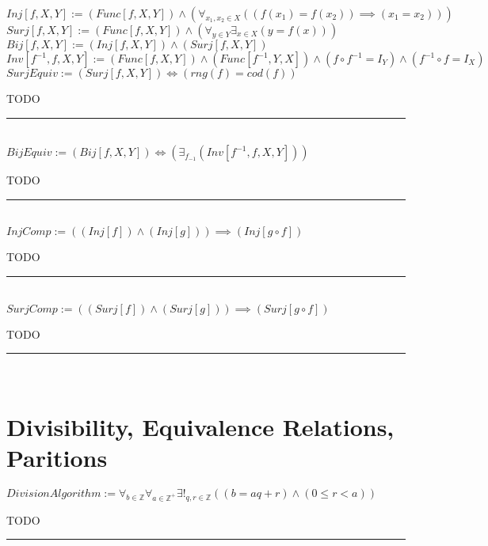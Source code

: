 \documentclass{book}
\newcommand{\abr}{:=}
\begin{document}
$Inj[f, X, Y] \abr (Func[f, X, Y]) \land (\forall_{x_1, x_2 \in X}((f(x_1) = f(x_2)) \implies (x_1 = x_2)))$ \\ %
$Surj[f, X, Y] \abr (Func[f, X, Y]) \land (\forall_{y \in Y} \exists_{x \in X}(y = f(x)))$ \\ %
$Bij[f, X, Y] \abr (Inj[f, X, Y]) \land (Surj[f, X, Y])$ \\ %
$Inv[f^{-1}, f, X, Y] \abr (Func[f, X, Y]) \land (Func[f^{-1}, Y, X]) \land (f \circ f^{-1} = I_Y) \land (f^{-1} \circ f = I_X)$ \\

$SurjEquiv \abr (Surj[f, X, Y]) \iff (rng(f) = cod(f))$ \\
\begin{enumerate}
  \lit TODO
\end{enumerate} \vspace{.75mm} \hrule \vspace{.75mm} \ \\ 

$BijEquiv \abr (Bij[f, X, Y]) \iff (\exists_{f_{-1}}(Inv[f^{-1}, f, X, Y]))$ \\
\begin{enumerate}
  \lit TODO
\end{enumerate} \vspace{.75mm} \hrule \vspace{.75mm} \ \\ 

$InjComp \abr ((Inj[f]) \land (Inj[g])) \implies (Inj[g \circ f])$
\begin{enumerate}
  \lit TODO
\end{enumerate} \vspace{.75mm} \hrule \vspace{.75mm} \ \\ 

$SurjComp \abr ((Surj[f]) \land (Surj[g])) \implies (Surj[g \circ f])$
\begin{enumerate}
  \lit TODO
\end{enumerate} \vspace{.75mm} \hrule \vspace{.75mm} \ \\ 


\section{Divisibility, Equivalence Relations, Paritions}
$DivisionAlgorithm \abr \forall_{b \in \mathbb{Z}} \forall_{a \in \mathbb{Z}^+} \exists!_{q, r \in \mathbb{Z}}((b = a q + r) \land (0 \leq r < a))$
\begin{enumerate}
  \lit TODO
\end{enumerate} \vspace{.75mm} \hrule \vspace{.75mm} \ \\ 
\end{document}
